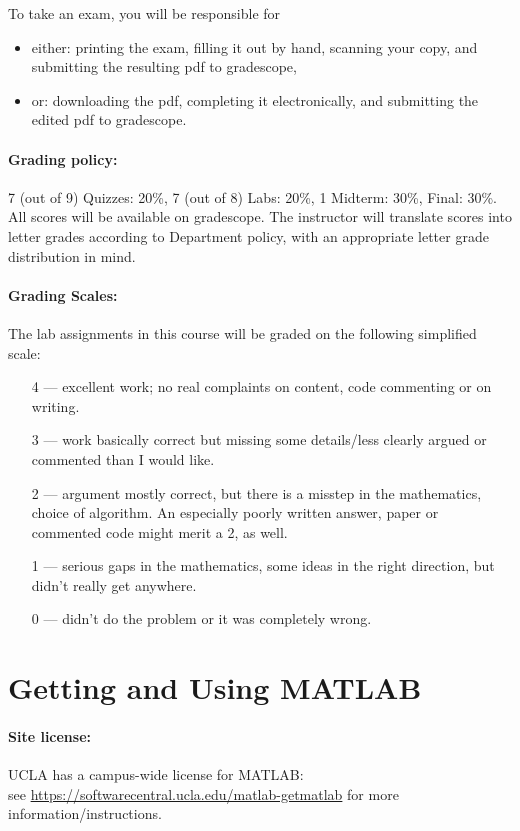 \documentclass[11pt,letter]{article}
\begin{document}
To take an exam, you will be responsible for
\begin{itemize}
\item either: printing the exam, filling it out by hand, scanning your copy, and submitting the resulting pdf to gradescope,
\item or: downloading the pdf, completing it electronically, and submitting the edited pdf to gradescope.
\end{itemize}

\paragraph{Grading policy:} 
7 (out of 9) Quizzes: 20\%, 7 (out of 8) Labs: 20\%,  1 Midterm: 30\%, Final: 30\%.
All scores will be available on gradescope. The instructor will translate scores into letter grades according to Department policy, with an appropriate letter grade distribution in mind.

\paragraph{Grading Scales:} The lab assignments in this course will be graded on the following simplified scale:
\begin{itemize}
\item[4 ---] excellent work; no real complaints on content, code commenting or on writing.
\item[3 ---] work basically correct but missing some details/less clearly argued or commented than I
would like.
\item[2 ---] argument mostly correct, but there is a misstep in the mathematics, choice of algorithm.
An especially poorly written answer, paper or commented code might merit a 2, as well.
\item[1 ---] serious gaps in the mathematics, some ideas in the right direction, but didn't really get
anywhere.
\item[0 ---] didn't do the problem or it was completely wrong.
\end{itemize}


\newpage
\section*{Getting and Using MATLAB}

\paragraph{Site license:}
UCLA has a campus-wide license for MATLAB:\\
 see  \url{https://softwarecentral.ucla.edu/matlab-getmatlab} for more information/instructions.
\end{document}
